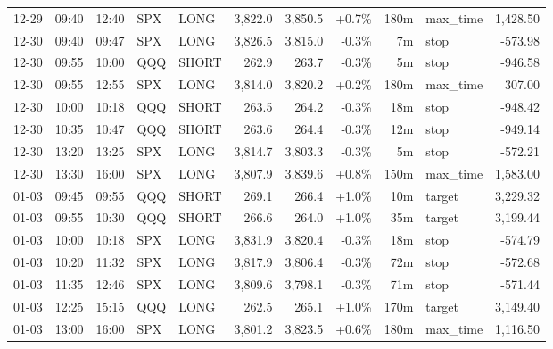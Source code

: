 \documentclass[11pt,a4paper,twoside]{article}
\begin{document}
\begin{center}
\begin{longtable}{>{\color{txtmain}}l l l l l r r r r >{\color{txtmain}}l r}
12-29 & 09:40 & 12:40 & SPX & LONG & 3,822.0 & 3,850.5 & \textcolor{wingreen}{+0.7\%} & 180m & max\_time & \textcolor{wingreen}{1,428.50} \\
12-30 & 09:40 & 09:47 & SPX & LONG & 3,826.5 & 3,815.0 & \textcolor{lossred}{-0.3\%} & 7m & stop & \textcolor{lossred}{-573.98} \\
12-30 & 09:55 & 10:00 & QQQ & SHORT & 262.9 & 263.7 & \textcolor{lossred}{-0.3\%} & 5m & stop & \textcolor{lossred}{-946.58} \\
12-30 & 09:55 & 12:55 & SPX & LONG & 3,814.0 & 3,820.2 & \textcolor{wingreen}{+0.2\%} & 180m & max\_time & \textcolor{wingreen}{307.00} \\
12-30 & 10:00 & 10:18 & QQQ & SHORT & 263.5 & 264.2 & \textcolor{lossred}{-0.3\%} & 18m & stop & \textcolor{lossred}{-948.42} \\
12-30 & 10:35 & 10:47 & QQQ & SHORT & 263.6 & 264.4 & \textcolor{lossred}{-0.3\%} & 12m & stop & \textcolor{lossred}{-949.14} \\
12-30 & 13:20 & 13:25 & SPX & LONG & 3,814.7 & 3,803.3 & \textcolor{lossred}{-0.3\%} & 5m & stop & \textcolor{lossred}{-572.21} \\
12-30 & 13:30 & 16:00 & SPX & LONG & 3,807.9 & 3,839.6 & \textcolor{wingreen}{+0.8\%} & 150m & max\_time & \textcolor{wingreen}{1,583.00} \\
01-03 & 09:45 & 09:55 & QQQ & SHORT & 269.1 & 266.4 & \textcolor{wingreen}{+1.0\%} & 10m & target & \textcolor{wingreen}{3,229.32} \\
01-03 & 09:55 & 10:30 & QQQ & SHORT & 266.6 & 264.0 & \textcolor{wingreen}{+1.0\%} & 35m & target & \textcolor{wingreen}{3,199.44} \\
01-03 & 10:00 & 10:18 & SPX & LONG & 3,831.9 & 3,820.4 & \textcolor{lossred}{-0.3\%} & 18m & stop & \textcolor{lossred}{-574.79} \\
01-03 & 10:20 & 11:32 & SPX & LONG & 3,817.9 & 3,806.4 & \textcolor{lossred}{-0.3\%} & 72m & stop & \textcolor{lossred}{-572.68} \\
01-03 & 11:35 & 12:46 & SPX & LONG & 3,809.6 & 3,798.1 & \textcolor{lossred}{-0.3\%} & 71m & stop & \textcolor{lossred}{-571.44} \\
01-03 & 12:25 & 15:15 & QQQ & LONG & 262.5 & 265.1 & \textcolor{wingreen}{+1.0\%} & 170m & target & \textcolor{wingreen}{3,149.40} \\
01-03 & 13:00 & 16:00 & SPX & LONG & 3,801.2 & 3,823.5 & \textcolor{wingreen}{+0.6\%} & 180m & max\_time & \textcolor{wingreen}{1,116.50} \\

\end{longtable}
\end{center}
\end{document}

